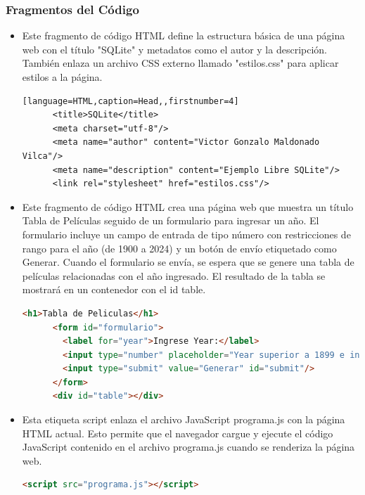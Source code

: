 \documentclass{article}
\begin{document}
  \subsubsection{Fragmentos del Código}
  \begin{itemize}
    \item Este fragmento de código HTML define la estructura básica de una página web con el título "SQLite" y metadatos 
      como el autor y la descripción. También enlaza un archivo CSS externo llamado "estilos.css" para aplicar estilos a la página.
    \begin{lstlisting}[language=HTML,caption=Head,,firstnumber=4]
      <title>SQLite</title>
      <meta charset="utf-8"/>
      <meta name="author" content="Victor Gonzalo Maldonado Vilca"/>
      <meta name="description" content="Ejemplo Libre SQLite"/>
      <link rel="stylesheet" href="estilos.css"/>
    \end{lstlisting}
    \newpage
    \item Este fragmento de código HTML crea una página web que muestra un título Tabla de Películas seguido de un 
      formulario para ingresar un año. El formulario incluye un campo de entrada de tipo número con restricciones de 
      rango para el año (de 1900 a 2024) y un botón de envío etiquetado como Generar. Cuando el formulario se envía, se 
      espera que se genere una tabla de películas relacionadas con el año ingresado. El resultado de la tabla se mostrará 
      en un contenedor con el id table.
    \begin{lstlisting}[language=HTML,caption=Body,firstnumber=12]
      <h1>Tabla de Peliculas</h1>
      <form id="formulario">
        <label for="year">Ingrese Year:</label>
        <input type="number" placeholder="Year superior a 1899 e inferior 2025" id="year" name="year" min="1900" max="2024"/>
        <input type="submit" value="Generar" id="submit"/>
      </form>
      <div id="table"></div>
    \end{lstlisting}
    \item Esta etiqueta script enlaza el archivo JavaScript programa.js con la página HTML actual. Esto permite 
      que el navegador cargue y ejecute el código JavaScript contenido en el archivo programa.js cuando se renderiza la página web.
    \begin{lstlisting}[language=HTML,caption=Script,firstnumber=20]
      <script src="programa.js"></script>
    \end{lstlisting}
  \end{itemize}
  
\end{document}
